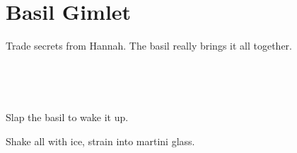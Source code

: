 \section[Basil Gimlet]{Basil Gimlet~}

\begin{recipestats}[
        servings=1,
        preptime=5~\minute,
        original=Hannah and Emma,
    ]
\end{recipestats}

\begin{recipeabstract}
    Trade secrets from Hannah.
    The basil really brings it all together.
\end{recipeabstract}

\begin{ingredientcolumns}
    \begin{ingredientblock}
        \\
    \end{ingredientblock}
    \begin{ingredientblock}
        \\
    \end{ingredientblock}
\end{ingredientcolumns}

\begin{preparation}
\item Slap the basil to wake it up.
\item Shake all with ice, strain into martini glass.
\end{preparation}
\recipeend%
